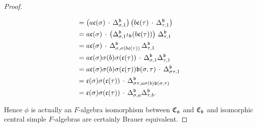 \begin{proof}
\begin{enumerate}
\[\begin{aligned}
              &= \left(
                a\mathfrak{c}(\sigma)
                \, \cdot \,
                \Delta^{\mathfrak{b}}_{\sigma, 1}
                \right)
                \left(
                b \mathfrak{c}(\tau)
                \, \cdot \,
                \Delta^{\mathfrak{b}}_{\tau, 1}
                \right)\\
              &= a\mathfrak{c}(\sigma) \, \cdot \,
                \left(\Delta^{\mathfrak{b}}_{\sigma, 1}
                \iota_{\mathfrak{b}}(b\mathfrak{c}(\tau))\right) \,
                \Delta^{\mathfrak{b}}_{\tau, 1} \\
              &=
                a\mathfrak{c}(\sigma) \, \cdot \,
                \Delta^{\mathfrak{b}}_{\sigma, \sigma(b\mathfrak{c}(\tau))}\,
                \Delta^{\mathfrak{b}}_{\tau, 1} \\
              &= a\mathfrak{c}(\sigma)\sigma(b)\sigma(\mathfrak{c}(\tau)) \, \cdot \,
                \Delta^{\mathfrak{b}}_{\sigma, 1}\Delta_{\tau, 1}^{\mathfrak{b}}\\
              &= a\mathfrak{c}(\sigma)\sigma(b)\sigma(\mathfrak{c}(\tau))\mathfrak{b}(\sigma,\tau) \, \cdot \, \Delta^{\mathfrak{b}}_{\sigma\tau, 1}\\
              &= \mathfrak{c}(\sigma)\sigma(\mathfrak{c}(\tau)) \, \cdot \, \Delta^{\mathfrak{b}}_{\sigma\tau, a\sigma(b)\mathfrak{b}(\sigma,\tau)}\\
              &= \mathfrak{c}(\sigma)\sigma(\mathfrak{c}(\tau)) \, \cdot \, \Delta^{\mathfrak{b}}_{\sigma, a}\Delta^{\mathfrak{b}}_{\tau, b}.
            \end{aligned}
            \]
    \end{enumerate}
    Hence $\phi$ is actually an $F$-algebra isomorphism between $\operatorname{\mathfrak{C}}_{\mathfrak{a}}$ and $\operatorname{\mathfrak{C}}_{\mathfrak{b}}$ and isomorphic central simple $F$-algebras are certainly Brauer equivalent.
  \end{proof}



